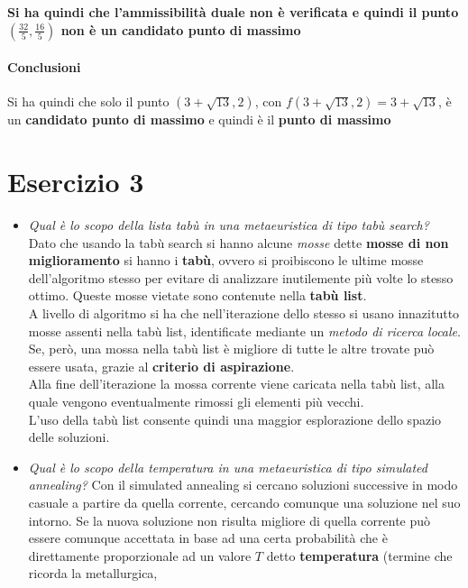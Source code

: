 \documentclass[a4paper,12pt, oneside]{book}
\begin{document}
\textbf{Si ha quindi che l'ammissibilità duale non è verificata e quindi il
  punto $\left(\frac{32}{5},\frac{16}{5}\right)$ non è un candidato
  punto di massimo}
\subsubsection{Conclusioni}
\begin{shaded}
  Si ha quindi che solo il punto $(3+\sqrt{13},2)$, con
  $f(3+\sqrt{13},2)=3+\sqrt{13}$, è un \textbf{candidato punto di
    massimo} e quindi è il \textbf{punto di massimo}
\end{shaded}
\chapter{Esercizio 3}
\begin{itemize}
  \item \textit{Qual è lo scopo della lista tabù in una metaeuristica
    di tipo tabù search?}\\
  Dato che usando la tabù search si hanno alcune \textit{mosse} dette
  \textbf{mosse di non miglioramento} si hanno i \textbf{tabù}, ovvero
  si proibiscono le ultime mosse dell'algoritmo stesso per evitare di
  analizzare inutilemente più volte lo stesso ottimo. Queste mosse
  vietate sono contenute nella \textbf{tabù list}.\\
  A livello di algoritmo si ha che nell'iterazione dello stesso si
  usano innazitutto mosse assenti nella tabù list, identificate
  mediante un \textit{metodo di ricerca locale}. Se, però, una mossa
  nella tabù list è migliore di tutte le altre trovate può essere
  usata, grazie al \textbf{criterio di aspirazione}.\\
  Alla fine dell'iterazione la mossa corrente viene caricata nella
  tabù list, alla quale vengono eventualmente rimossi gli elementi più
  vecchi.\\
  L'uso della tabù list consente quindi una maggior esplorazione dello
  spazio delle soluzioni.
  \item \textit{Qual è lo scopo della temperatura in una metaeuristica
    di tipo simulated annealing?}
  Con il simulated annealing si cercano soluzioni successive in modo
  casuale a partire da quella corrente, cercando comunque una
  soluzione nel suo intorno. Se la nuova soluzione non risulta
  migliore di quella corrente può essere comunque accettata in base ad
  una certa probabilità che è direttamente proporzionale ad un valore
  $T$ detto \textbf{temperatura} (termine che ricorda la metallurgica,

\end{itemize}
\end{document}

